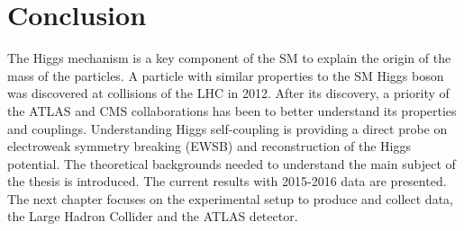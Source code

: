 
\section{Conclusion}
\label{chap1:Conc}
The Higgs mechanism is a key component of the SM to explain the origin of the mass of the particles. A particle with similar properties to the SM Higgs boson was discovered at collisions of the LHC in 2012. After its discovery, a priority of the ATLAS and CMS collaborations has been to better understand its properties and couplings. Understanding Higgs self-coupling is providing a direct probe on electroweak symmetry breaking (EWSB) and reconstruction of the Higgs potential. The theoretical backgrounds needed to understand the main subject of the thesis is introduced. The current \HHyybb results with 2015-2016 data are presented. %
The next chapter focuses on the experimental setup to produce and collect data, the Large Hadron Collider and the ATLAS detector. 

